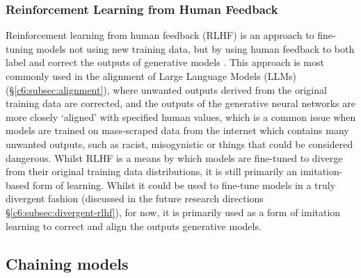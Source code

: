 \subsubsection{Reinforcement Learning from Human Feedback} 

Reinforcement learning from human feedback (RLHF) is an approach to fine-tuning models not using new training data, but by using human feedback to both label and correct the outputs of generative models \citep{ziegler2019fine}. 
This approach is most commonly used in the alignment of Large Language Models (LLMs) (\S \ref{c6:subsec:alignment}), where unwanted outputs derived from the original training data are corrected, and the outputs of the generative neural networks are more closely `aligned' with specified human values, which is a common issue when models are trained on mass-scraped data from the internet which contains many unwanted outputs, such as racist, misogynistic or things that could be considered dangerous.
Whilst RLHF is a means by which models are fine-tuned to diverge from their original training data distributions, it is still primarily an imitation-based form of learning.
Whilst it could be used to fine-tune models in a truly divergent fashion (discussed in the future research directions \S \ref{c6:subsec:divergent-rlhf}), for now, it is primarily used as a form of imitation learning to correct and align the outputs generative models.

\subsection{Chaining models}
\label{survey:chaining}

